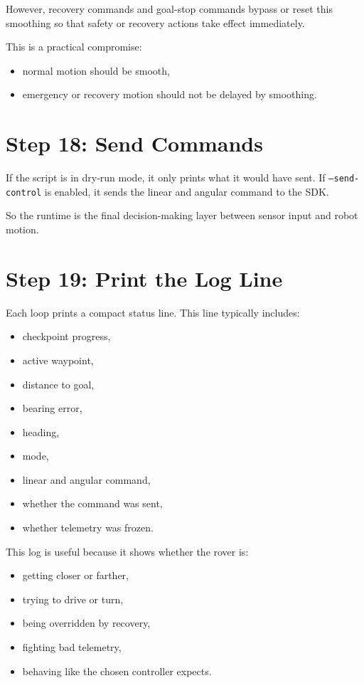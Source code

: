 \documentclass[11pt]{article}
\begin{document}
However, recovery commands and goal-stop commands bypass or reset this smoothing so that safety or recovery actions take effect immediately.

This is a practical compromise:
\begin{itemize}[leftmargin=*]
\item normal motion should be smooth,
\item emergency or recovery motion should not be delayed by smoothing.
\end{itemize}

\section*{Step 18: Send Commands}
If the script is in dry-run mode, it only prints what it would have sent.
If \texttt{--send-control} is enabled, it sends the linear and angular command to the SDK.

So the runtime is the final decision-making layer between sensor input and robot motion.

\section*{Step 19: Print the Log Line}
Each loop prints a compact status line.
This line typically includes:
\begin{itemize}[leftmargin=*]
\item checkpoint progress,
\item active waypoint,
\item distance to goal,
\item bearing error,
\item heading,
\item mode,
\item linear and angular command,
\item whether the command was sent,
\item whether telemetry was frozen.
\end{itemize}

This log is useful because it shows whether the rover is:
\begin{itemize}[leftmargin=*]
\item getting closer or farther,
\item trying to drive or turn,
\item being overridden by recovery,
\item fighting bad telemetry,
\item behaving like the chosen controller expects.
\end{itemize}
\end{document}
